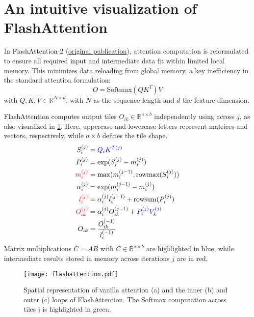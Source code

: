 \documentclass{article}
\begin{document}

\section*{An intuitive visualization of FlashAttention}

In FlashAttention-2 (\href{https://arxiv.org/abs/2307.08691}{original publication}), attention computation is reformulated to ensure all required input and intermediate data fit within limited local memory.
This minimizes data reloading from global memory, a key inefficiency in the standard attention formulation:
$$ O = \mathrm{Softmax}(Q K^T)V $$
with $Q, K, V \in \mathbb{R}^{N \times d}$, with $N$ as the sequence length and $d$ the feature dimension.

FlashAttention computes output tiles $O_{ik} \in \mathbb{R}^{a \times b}$ independently using  across $j$, as also visualized in \cref{fig:flashattention}.
Here, uppercase and lowercase letters represent matrices and vectors, respectively, while $a \times b$ defines the tile shape.
\begin{align}
  S_i^{(j)} &= \textcolor{blue}{Q_i K^{T(j)}} \label{eq:s} \\
  P_i^{(j)} &= \exp(S_i^{(j)} - m_i^{(j)}) \label{eq:p} \\
  \textcolor{red}{m_i^{(j)}} &= \max(m_i^{(j-1)}, \text{rowmax} (S_i^{(j)})) \label{eq:m} \\
  \alpha_i^{(j)} &= \exp(m_i^{(j-1)} - m_i^{(j)}) \label{eq:alpha} \\
  \textcolor{red}{l_i^{(j)}} &= \alpha_i^{(j)} l_i^{(j-1)} + \text{rowsum}(P_i^{(j)}) \label{eq:l} \\
  \textcolor{red}{O_{ik}^{(j)}} &= \alpha_i^{(j)} O_{ik}^{(j-1)} + \textcolor{blue}{P_i^{(j)} V_k^{(j)}} \label{eq:oikj} \\
  O_{ik} &= \frac{O_{ik}^{(-1)}}{l_i^{(-1)}} \label{eq:oik}
\end{align}
Matrix multiplications $C=AB$ with $C \in \mathbb{R}^{a \times b}$ are highlighted in blue, while intermediate results stored in memory across iterations $j$ are in red.

\begin{figure}
  \centering
  \texttt{[image: flashattention.pdf]}
  \caption{
    Spatial representation of vanilla attention (a) and the inner (b) and outer (c) loops of FlashAttention.
    The Softmax computation across tiles j is highlighted in green.
  }
  \label{fig:flashattention}
\end{figure}
\end{document}

